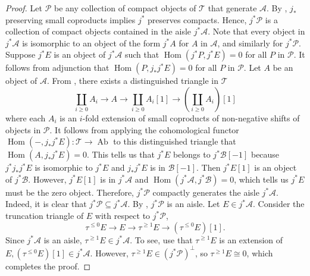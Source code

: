 \documentclass[11pt]{amsart}
\theoremstyle{plain}
\theoremstyle{definition}
\numberwithin{equation}{section}
\numberwithin{theorem}{section}
\begin{document}
\begin{proof}
    Let $\mathcal{P}$ be any collection of compact objects of $\mathcal{T}$ that generate $\mathcal{A}$. By \cite[Theorem 5.1]{Neeman:1996}, $j_\ast$ preserving small coproducts implies $j^\ast$ preserves compacts. Hence, $j^\ast \mathcal{P}$ is a collection of compact objects contained in the aisle $j^\ast \mathcal{A}$. Note that every object in $j^\ast \mathcal{A}$ is isomorphic to an object of the form $j^\ast A$ for $A$ in $\mathcal{A}$, and similarly for $j^\ast \mathcal{P}$. Suppose $j^\ast E$ is an object of $j^\ast \mathcal{A}$ such that $\operatorname{Hom}(j^\ast P,j^\ast E)=0$ for all $P$ in $\mathcal{P}$. It follows from adjunction that $\operatorname{Hom}(P, j_\ast j^\ast E)=0$ for all $P$ in $\mathcal{P}$. Let $A$ be an object of $\mathcal{A}$. From \cite[Theorem 12.1]{Keller/Nicolas:2013}, there exists a distinguished triangle in $\mathcal{T}$
    \begin{displaymath}
        \coprod_{i\geq 0} A_i \to A \to \coprod_{i\geq 0} A_i[1] \to (\coprod_{i\geq 0} A_i)[1]
    \end{displaymath}
    where each $A_i$ is an $i$-fold extension of small coproducts of non-negative shifts of objects in $\mathcal{P}$. It follows from applying the cohomological functor $\operatorname{Hom}(-,j_\ast j^\ast E) \colon \mathcal{T} \to \operatorname{Ab}$ to this distinguished triangle that $\operatorname{Hom}(A,j_\ast j^\ast E)=0$. This tells us that $j^\ast E$ belongs to $j^\ast \mathcal{B}[-1]$ because $j^\ast j_\ast j^\ast E$ is isomorphic to $j^\ast E$ and $j_\ast j^\ast E$ is in $\mathcal{B}[-1]$. Then $j^\ast E [1]$ is an object of $j^\ast \mathcal{B}$. However, $j^\ast E[1]$ is in $j^\ast \mathcal{A}$ and $\operatorname{Hom}(j^\ast \mathcal{A},j^\ast \mathcal{B})=0$, which tells us $j^\ast E$ must be the zero object. Therefore, $j^\ast \mathcal{P}$ compactly generates the aisle $j^\ast \mathcal{A}$. Indeed, it is clear that $j^\ast \mathcal{P}\subseteq j^\ast \mathcal{A}$. By \cite[Theorem 2.3]{Neeman:2021a}, $j^\ast \mathcal{P}$ is an aisle. Let $E\in j^\ast \mathcal{A}$. Consider the truncation triangle of $E$ with respect to $j^\ast \mathcal{P}$,
    \begin{displaymath}
        \tau^{\leq 0} E \to E \to \tau^{\geq 1} E \to (\tau^{\leq 0} E)[1].
    \end{displaymath}
    Since $j^\ast \mathcal{A}$ is an aisle, $\tau^{\geq 1} E \in j^\ast \mathcal{A}$. To see, use that $\tau^{\geq 1} E$ is an extension of $E,(\tau^{\leq 0} E)[1]\in j^\ast \mathcal{A}$. However, $\tau^{\geq 1} E \in (j^\ast \mathcal{P})^\perp$, so $\tau^{\geq 1} E \cong 0$, which completes the proof.
\end{proof}
\end{document}
